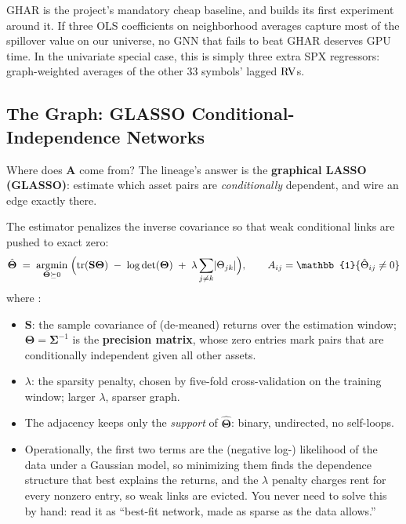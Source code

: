 \begin{projectconnection}
GHAR is the project's mandatory cheap baseline, and  builds its first experiment around it. If three OLS coefficients on neighborhood averages capture most of the spillover value on our universe, no GNN that fails to beat GHAR deserves GPU time. In the univariate special case, this is simply three extra SPX regressors: graph-weighted averages of the other 33 symbols' lagged $\operatorname{RV}$s.
\end{projectconnection}

\subsection{The Graph: GLASSO Conditional-Independence Networks}\label{sec:gnn:glasso}

Where does $\mathbf{A}$ come from? The lineage's answer is the \textbf{graphical LASSO (GLASSO)}: estimate which asset pairs are \emph{conditionally} dependent, and wire an edge exactly there.

The estimator penalizes the inverse covariance so that weak conditional links are pushed to exact zero:
\begin{equation}\label{eq:gnn:glasso}
  \hat{\bm{\Theta}} \;=\; \operatorname*{argmin}_{\bm{\Theta} \succeq 0}\;
  \Bigl( \tr(\mathbf{S}\bm{\Theta}) \;-\; \log\det(\bm{\Theta}) \;+\; \lambda \sum_{j \neq k} \lvert \Theta_{jk} \rvert \Bigr),
  \qquad
  A_{ij} = \mathbb{1}\{\hat{\Theta}_{ij} \neq 0\}
\end{equation}
where \citep[p.~8]{ZhangPuCucuringuDong2024}:
\begin{itemize}[nosep]
  \item $\mathbf{S}$: the sample covariance of (de-meaned) returns over the estimation window; $\bm{\Theta} = \bm{\Sigma}^{-1}$ is the \textbf{precision matrix}, whose zero entries mark pairs that are conditionally independent given all other assets.
  \item $\lambda$: the sparsity penalty, chosen by five-fold cross-validation on the training window; larger $\lambda$, sparser graph.
  \item The adjacency keeps only the \emph{support} of $\hat{\bm{\Theta}}$: binary, undirected, no self-loops.
  \item Operationally, the first two terms are the (negative log-) likelihood of the data under a Gaussian model, so minimizing them finds the dependence structure that best explains the returns, and the $\lambda$ penalty charges rent for every nonzero entry, so weak links are evicted. You never need to solve this by hand: read it as ``best-fit network, made as sparse as the data allows.''
\end{itemize}

